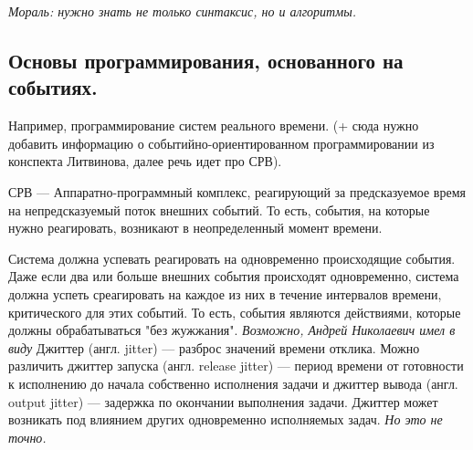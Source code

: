 \documentclass[12pt, a4paper]{article}
\begin{document}
\begin{figure}[h]
\end{figure}

\textit{Мораль: нужно знать не только синтаксис, но и алгоритмы.}

\subsection{Основы программирования, основанного на событиях.}

Например, программирование систем реального времени. (+ сюда нужно добавить информацию о событийно-ориентированном программировании из конспекта Литвинова, далее речь идет про СРВ).

СРВ --- Аппаратно-программный комплекс, реагирующий за предсказуемое время на непредсказуемый поток внешних событий. То есть, события, на которые нужно реагировать, возникают в неопределенный момент времени.

Система должна успевать реагировать на одновременно происходящие события. Даже если два или больше внешних события происходят одновременно, система должна успеть среагировать на каждое из них в течение интервалов времени, критического для этих событий. То есть, события являются действиями, которые должны обрабатываться "без жужжания"{}. \textit{Возможно, Андрей Николаевич имел в виду} Джиттер (англ. jitter) — разброс значений времени отклика. Можно различить джиттер запуска (англ. release jitter) — период времени от готовности к исполнению до начала собственно исполнения задачи и джиттер вывода (англ. output jitter) — задержка по окончании выполнения задачи. Джиттер может возникать под влиянием других одновременно исполняемых задач. \textit{Но это не точно.}\\
\end{document}
